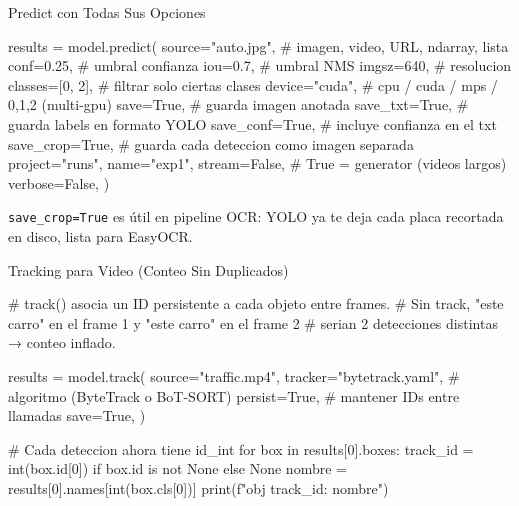 \begin{frame}{Predict con Todas Sus Opciones}
  \vspace{-4pt}
  \begin{pyblock}
results = model.predict(
    source="auto.jpg",        # imagen, video, URL, ndarray, lista
    conf=0.25,                # umbral confianza
    iou=0.7,                  # umbral NMS
    imgsz=640,                # resolucion
    classes=[0, 2],           # filtrar solo ciertas clases
    device="cuda",            # cpu / cuda / mps / 0,1,2 (multi-gpu)
    save=True,                # guarda imagen anotada
    save_txt=True,            # guarda labels en formato YOLO
    save_conf=True,           # incluye confianza en el txt
    save_crop=True,           # guarda cada deteccion como imagen separada
    project="runs", name="exp1",
    stream=False,             # True = generator (videos largos)
    verbose=False,
)
  \end{pyblock}

  \vspace{4pt}
  {\scriptsize\color{textMuted}
    \faLightbulb\hspace{4pt} \texttt{save\_crop=True} es \'util en pipeline OCR:
    YOLO ya te deja cada placa recortada en disco, lista para EasyOCR.}
\end{frame}

\begin{frame}{Tracking para Video (Conteo Sin Duplicados)}
  \vspace{-4pt}
  \begin{pyblock}
# track() asocia un ID persistente a cada objeto entre frames.
# Sin track, "este carro" en el frame 1 y "este carro" en el frame 2
# serian 2 detecciones distintas → conteo inflado.

results = model.track(
    source="traffic.mp4",
    tracker="bytetrack.yaml",   # algoritmo (ByteTrack o BoT-SORT)
    persist=True,               # mantener IDs entre llamadas
    save=True,
)

# Cada deteccion ahora tiene id_int
for box in results[0].boxes:
    track_id = int(box.id[0]) if box.id is not None else None
    nombre = results[0].names[int(box.cls[0])]
    print(f"obj {track_id}: {nombre}")
  \end{pyblock}
\end{frame}

